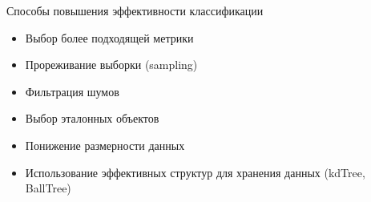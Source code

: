 \documentclass[red,unicode]{beamer}
\newcommand{\bfc}{\bf\color{main!80!black}}
\begin{document}
\begin{frame}{Способы повышения эффективности классификации}
\begin{itemize}
	\item Выбор более подходящей метрики
	\item Прореживание выборки (sampling)
	\item Фильтрация шумов
	\item Выбор эталонных объектов
	\item Понижение размерности данных
	\item Использование эффективных структур для хранения данных (kdTree, BallTree)

\end{itemize}
\end{frame}

%
%

\end{document}
